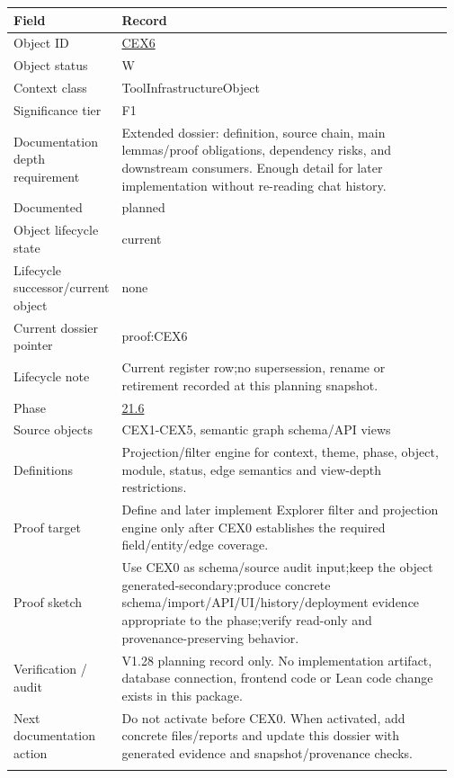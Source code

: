 \begin{longtable}{L{0.16\linewidth} L{0.81\linewidth}}
\hline
\textbf{Field} & \textbf{Record}\\
\hline
Object ID & \hyperlink{object-row-CEX6}{CEX6}\\
\hline\addlinespace[0.20em]
Object status & W\\
\hline\addlinespace[0.20em]
Context class & ToolInfrastructureObject\\
\hline\addlinespace[0.20em]
Significance tier & F1\\
\hline\addlinespace[0.20em]
Documentation depth requirement & Extended dossier: definition, source chain, main lemmas/\allowbreak{}proof obligations, dependency risks, and downstream consumers. Enough detail for later implementation without re-reading chat history.\\
\hline\addlinespace[0.20em]
Documented & planned\\
\hline\addlinespace[0.20em]
Object lifecycle state & current\\
\hline\addlinespace[0.20em]
Lifecycle successor/\allowbreak{}current object & none\\
\hline\addlinespace[0.20em]
Current dossier pointer & proof:CEX6\\
\hline\addlinespace[0.20em]
Lifecycle note & Current register row;\newline no supersession, rename or retirement recorded at this planning snapshot.\\
\hline\addlinespace[0.20em]
Phase & \hyperlink{phase-row-21-6}{21.6}\\
\hline\addlinespace[0.20em]
Source objects & CEX1-CEX5, semantic graph schema/\allowbreak{}API views\\
\hline\addlinespace[0.20em]
Definitions & Projection/\allowbreak{}filter engine for context, theme, phase, object, module, status, edge semantics and view-depth restrictions.\\
\hline\addlinespace[0.20em]
Proof target & Define and later implement Explorer filter and projection engine only after CEX0 establishes the required field/\allowbreak{}entity/\allowbreak{}edge coverage.\\
\hline\addlinespace[0.20em]
Proof sketch & Use CEX0 as schema/\allowbreak{}source audit input;\newline keep the object generated-secondary;\newline produce concrete schema/\allowbreak{}import/\allowbreak{}API/\allowbreak{}UI/\allowbreak{}history/\allowbreak{}deployment evidence appropriate to the phase;\newline verify read-only and provenance-preserving behavior.\\
\hline\addlinespace[0.20em]
Verification /\allowbreak{} audit & V1.28 planning record only. No implementation artifact, database connection, frontend code or Lean code change exists in this package.\\
\hline\addlinespace[0.20em]
Next documentation action & Do not activate before CEX0. When activated, add concrete files/\allowbreak{}reports and update this dossier with generated evidence and snapshot/\allowbreak{}provenance checks.\\
\hline\addlinespace[0.20em]
\end{longtable}

